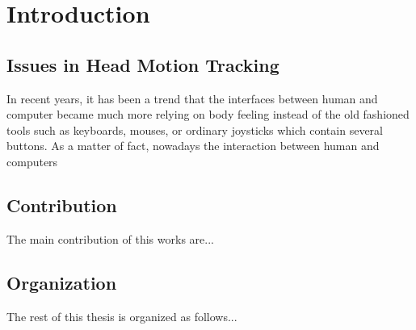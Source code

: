 \chapter{Introduction}
\label{c:intro}

\section{Issues in Head Motion Tracking}
In recent years, it has been a trend that the interfaces between human and computer became much more relying on body feeling instead of the old fashioned tools such as keyboards, mouses, or ordinary joysticks which contain several buttons. As a matter of fact, nowadays the interaction between human and computers 


\section{Contribution}
The main contribution of this works are...

\section{Organization}
The rest of this thesis is organized as follows...